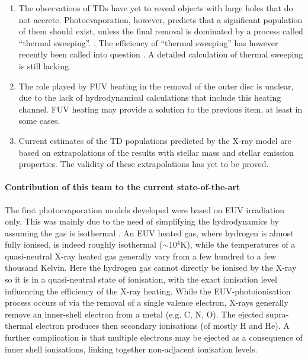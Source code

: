 \documentclass[10pt,fleqn,twoside]{article}
\begin{document}
\begin{enumerate}
\item The observations of TDs have yet to reveal objects with large
  holes that do not accrete. Photoevaporation, however, predicts that a
  significant population of them should exist, unless the final removal is dominated by a
  process called ``thermal sweeping''. 
  \citep{2012MNRAS.422.1880O}.
  The
  efficiency of  ``thermal sweeping'' has however recently been called
  into question 
  \citep{2016MNRAS.457.1905H}. A detailed calculation of thermal
  sweeping is still lacking. 
\item The role played by FUV heating in the removal of the outer disc
  is unclear, due to the lack of hydrodynamical calculations that
  include this heating channel. FUV heating may provide a solution to the
 previous item, at least in some cases. 
\item Current estimates of the TD populations predicted by the X-ray
  model are based on extrapolations of the results with stellar mass
  and stellar emission properties. The validity of these
  extrapolations has yet to be proved. 
\end{enumerate}

\paragraph{Contribution of this team to the current state-of-the-art}

The first photoevaporation models developed were based on EUV
irradiation only. This was mainly due to the need of simplifying the
hydrodynamics by assuming the gas is isothermal
\citep[]{2006MNRAS.369..216A, 2006MNRAS.369..229A}. 
An EUV heated gas, where
hydrogen is almost fully ionised, is indeed roughly isothermal
($\sim$10$^4$K), while the temperatures of a quasi-neutral X-ray
heated gas generally vary from a few hundred to a few thousand 
Kelvin. Here the hydrogen gas cannot directly be ionised by the X-ray
so it is in a quasi-neutral state of ionisation, with the
exact ionisation level influencing the efficiency of the X-ray
heating. While the EUV-photoionisation process occurs of via the removal
of a single valence electron, X-rays generally remove an inner-shell
electron from a metal (e.g. C, N, O). The ejected supra-thermal electron produces then secondary
ionisations (of mostly H and He). A further complication is that multiple electrons may be
ejected as a consequence of inner shell ionisations, linking together
non-adjacent ionisation levels.
\end{document}
